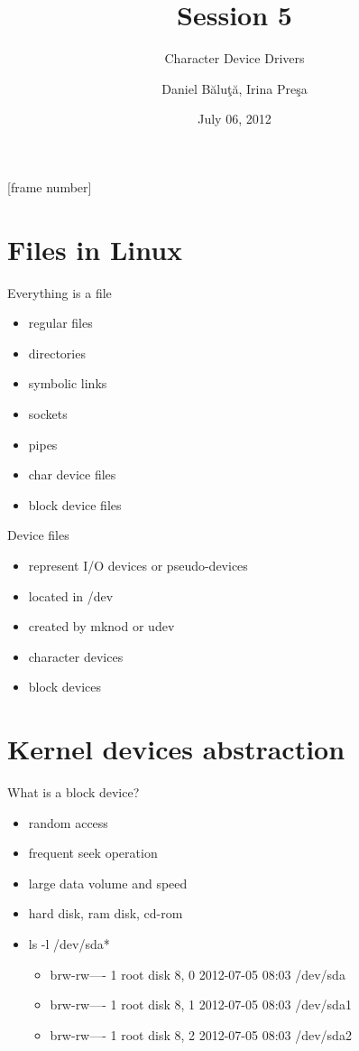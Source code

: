 \documentclass{workshop}
\title[Session 6]{Session 5}
\subtitle{Character Device Drivers}
\author{Daniel Băluţă, Irina Preşa}
\date{July 06, 2012}
\begin{document}
[frame number]

\frame{\titlepage}

\section{Files in Linux}
\begin{frame}{Everything is a file}

\begin{itemize}
\item regular files
\item directories
\item symbolic links
\item sockets
\item pipes
\item char device files
\item block device files
\end{itemize}
\end{frame}

\begin{frame}{Device files}
      \begin{itemize}
        \item represent I/O devices or pseudo-devices
	\item located in /dev
	\item created by mknod or udev
	\item character devices
	\item block devices
      \end{itemize}
\end{frame}

\section{Kernel devices abstraction}
\begin{frame}{What is a block device?}
      \begin{itemize}
        \item random access
	\item frequent seek operation
	\item large data volume and speed
	\item hard disk, ram disk, cd-rom
	\item  ls -l /dev/sda*
	\begin{itemize} 
	\item brw-rw---- 1 root disk 8, 0 2012-07-05 08:03 /dev/sda
	\item brw-rw---- 1 root disk 8, 1 2012-07-05 08:03 /dev/sda1
	\item brw-rw---- 1 root disk 8, 2 2012-07-05 08:03 /dev/sda2
	\end{itemize}
      \end{itemize}
\end{frame}
\end{document}
